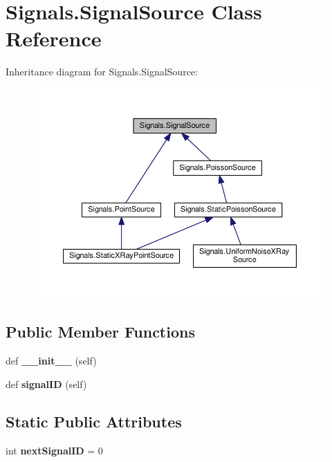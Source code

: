 \hypertarget{classSignals_1_1SignalSource}{}\section{Signals.\+Signal\+Source Class Reference}
\label{classSignals_1_1SignalSource}


Inheritance diagram for Signals.\+Signal\+Source\+:\nopagebreak
\begin{figure}[H]
\begin{center}
\leavevmode
\includegraphics[width=350pt]{classSignals_1_1SignalSource__inherit__graph}
\end{center}
\end{figure}
\subsection*{Public Member Functions}
\begin{DoxyCompactItemize}
\item 
def {\bfseries \+\_\+\+\_\+init\+\_\+\+\_\+} (self)\hypertarget{classSignals_1_1SignalSource_a18e58f799786c10300d066e9e0de7236}{}\label{classSignals_1_1SignalSource_a18e58f799786c10300d066e9e0de7236}

\item 
def {\bfseries signal\+ID} (self)\hypertarget{classSignals_1_1SignalSource_a85016cca8a7f1e188d314ced50577d05}{}\label{classSignals_1_1SignalSource_a85016cca8a7f1e188d314ced50577d05}

\end{DoxyCompactItemize}
\subsection*{Static Public Attributes}
\begin{DoxyCompactItemize}
\item 
int {\bfseries next\+Signal\+ID} = 0\hypertarget{classSignals_1_1SignalSource_abcff0d069f17cb5ebe3eff15b6283a64}{}\label{classSignals_1_1SignalSource_abcff0d069f17cb5ebe3eff15b6283a64}

\end{DoxyCompactItemize}
